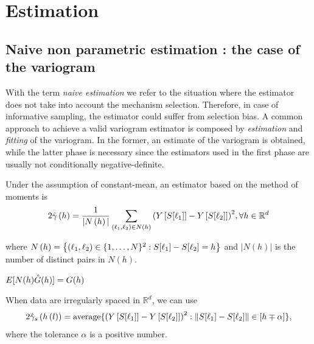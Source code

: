 \section{Estimation} \label{sec:estimation}

\subsection{Naive non parametric estimation : the case of the variogram}
With the term \emph{naive estimation} we refer to the situation where the estimator does not take into account the mechanism selection. Therefore, in case of informative sampling, the estimator could suffer from selection bias.
A common approach to achieve a valid variogram estimator is composed by \emph{estimation} and \emph{fitting} of the variogram. In the former, an estimate of the variogram is obtained, while the latter phase is necessary since the estimators used in the first phase are usually not conditionally negative-definite.

Under the assumption of constant-mean, an estimator based on the method of moments is \citep{matheron1962traite}
\begin{equation*} \label{eq:variogram_hat}
2\hat{\gamma}\left(h\right)=\frac{1}{|N\left(h\right)|}\sum_{(\ell_1,\ell_2)\in N\left(h\right)}{\left(Y\left[S[\ell_1]\right]-Y\left[S[\ell_2]\right]\right)^{2}},\forall h\in\mathbb{R}^{d}
\end{equation*}

where $N\left(h\right)=\left\{\left(\ell_1,\ell_2\right)\in\{1,\ldots,N\}^2:S[\ell_1]-S[\ell_2]=h\right\}$ and $|N\left(h\right)|$ is the number of distinct pairs in $N\left(h\right)$. 

\begin{property}
$E[N(h)\hat{G}(h)]=G(h)$
\end{property}


When data are irregularly spaced in $\mathbb{R}^{d}$, we can use
\begin{equation} \label{eq:variogram_hat1}
2\hat{\gamma}_{s}\left(h\left(l\right)\right)=\mathrm{average}\lbrace\left(\Signal\left[\Sample[\ell_1]\right]-\Signal\left[\Sample[\ell_2]\right]\right)^{2}:%
\|\Sample[\ell_1]-\Sample[\ell_2]\|\in[h\mp \alpha]\rbrace,
\end{equation}
where the tolerance $\alpha$ is a positive number.

